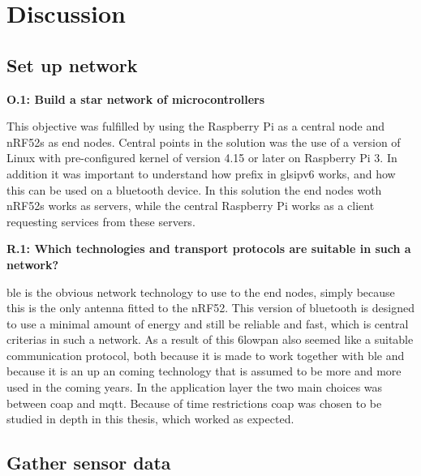 \chapter{Discussion}
\label{chp:dataAnalysis}


\section{Set up network}

\noindent \textbf{O.1: Build a star network of microcontrollers}

This objective was fulfilled by using the Raspberry Pi as a central node and nRF52s as end nodes. Central points in the solution was the use of a version of Linux with pre-configured kernel of version 4.15 or later on Raspberry Pi 3. In addition it was important to understand how prefix in gls{ipv6} works, and how this can be used on a bluetooth device. In this solution the end nodes woth \glspl{nRF52} works as servers, while the central Raspberry Pi works as a client requesting services from these servers. 


\noindent \textbf{R.1: Which technologies and transport protocols are suitable in such a network?}

\gls{ble} is the obvious network technology to use to the end nodes, simply because this is the only antenna fitted to the nRF52. This version of bluetooth is designed to use a minimal amount of energy and still be reliable and fast, which is central criterias in such a network. As a result of this \gls{6lowpan} also seemed like a suitable communication protocol, both because it is made to work together with \gls{ble} and because it is an up an coming technology that is assumed to be more and more used in the coming years. In the application layer the two main choices was between \gls{coap} and \gls{mqtt}. Because of time restrictions \gls{coap} was chosen to be studied in depth in this thesis, which worked as expected. 

\newpage

\section{Gather sensor data}

